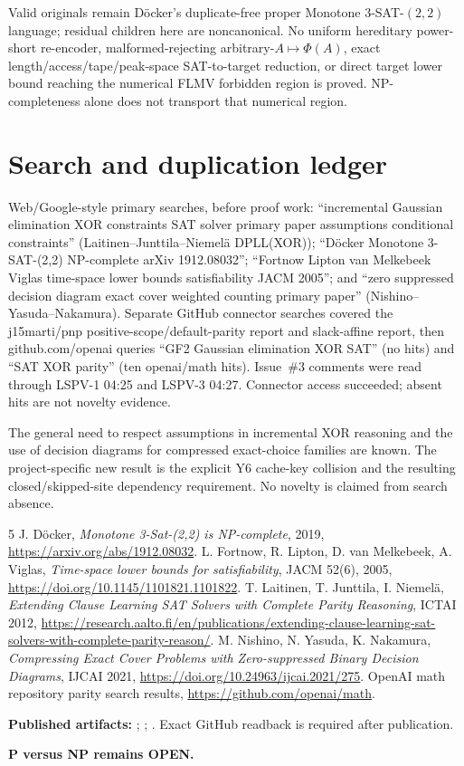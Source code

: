 \documentclass[11pt]{article}
\begin{document}
Valid originals remain D\"ocker's duplicate-free proper Monotone 3-SAT-$(2,2)$ language; residual children here are noncanonical.  No uniform hereditary power-short re-encoder, malformed-rejecting arbitrary-$A\mapsto\Phi(A)$, exact length/access/tape/peak-space SAT-to-target reduction, or direct target lower bound reaching the numerical FLMV forbidden region is proved.  NP-completeness alone does not transport that numerical region.

\section{Search and duplication ledger}
Web/Google-style primary searches, before proof work: ``incremental Gaussian elimination XOR constraints SAT solver primary paper assumptions conditional constraints'' (Laitinen--Junttila--Niemel\"a DPLL(XOR)); ``D\"ocker Monotone 3-SAT-(2,2) NP-complete arXiv 1912.08032''; ``Fortnow Lipton van Melkebeek Viglas time-space lower bounds satisfiability JACM 2005''; and ``zero suppressed decision diagram exact cover weighted counting primary paper'' (Nishino--Yasuda--Nakamura).  Separate GitHub connector searches covered the j15marti/pnp positive-scope/default-parity report and slack-affine report, then github.com/openai queries ``GF2 Gaussian elimination XOR SAT'' (no hits) and ``SAT XOR parity'' (ten openai/math hits).  Issue~\#3 comments were read through LSPV-1 04:25 and LSPV-3 04:27.  Connector access succeeded; absent hits are not novelty evidence.

The general need to respect assumptions in incremental XOR reasoning and the use of decision diagrams for compressed exact-choice families are known.  The project-specific new result is the explicit Y6 cache-key collision and the resulting closed/skipped-site dependency requirement.  No novelty is claimed from search absence.

\begin{thebibliography}{5}
 J. D\"ocker, \emph{Monotone 3-Sat-(2,2) is NP-complete}, 2019, \url{https://arxiv.org/abs/1912.08032}.
 L. Fortnow, R. Lipton, D. van Melkebeek, A. Viglas, \emph{Time-space lower bounds for satisfiability}, JACM 52(6), 2005, \url{https://doi.org/10.1145/1101821.1101822}.
 T. Laitinen, T. Junttila, I. Niemel\"a, \emph{Extending Clause Learning SAT Solvers with Complete Parity Reasoning}, ICTAI 2012, \url{https://research.aalto.fi/en/publications/extending-clause-learning-sat-solvers-with-complete-parity-reason/}.
 M. Nishino, N. Yasuda, K. Nakamura, \emph{Compressing Exact Cover Problems with Zero-suppressed Binary Decision Diagrams}, IJCAI 2021, \url{https://doi.org/10.24963/ijcai.2021/275}.
 OpenAI math repository parity search results, \url{https://github.com/openai/math}.
\end{thebibliography}

\noindent\textbf{Published artifacts:} ; ; .  Exact GitHub readback is required after publication.

\noindent\textbf{P versus NP remains OPEN.}
\end{document}
